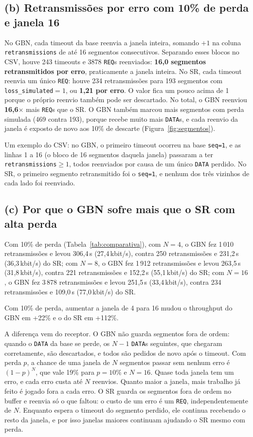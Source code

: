 \subsection*{(b) Retransmissões por erro com 10\% de perda e janela 16}

No GBN, cada timeout da base reenvia a janela inteira, somando $+1$ na coluna \texttt{retransmissions} de até 16 segmentos consecutivos. Separando esses blocos no CSV, houve 243 timeouts e 3878 \texttt{REQ}s reenviados: \textbf{16,0 segmentos retransmitidos por erro}, praticamente a janela inteira. No SR, cada timeout reenvia um único \texttt{REQ}: houve 234 retransmissões para 193 segmentos com \texttt{loss\_simulated}$=1$, ou \textbf{1,21 por erro}. O valor fica um pouco acima de 1 porque o próprio reenvio também pode ser descartado. No total, o GBN reenviou \textbf{16,6$\times$} mais \texttt{REQ}s que o SR. O GBN também marcou mais segmentos com perda simulada (469 contra 193), porque recebe muito mais \texttt{DATA}s, e cada reenvio da janela é exposto de novo aos 10\% de descarte (Figura~\ref{fig:segmentos}).

\par Um exemplo do CSV: no GBN, o primeiro timeout ocorreu na base \texttt{seq=1}, e as linhas 1 a 16 (o bloco de 16 segmentos daquela janela) passaram a ter \texttt{retransmissions}$\geq1$, todos reenviados por causa de um único \texttt{DATA} perdido. No SR, o primeiro segmento retransmitido foi o \texttt{seq=1}, e nenhum dos três vizinhos de cada lado foi reenviado.

\subsection*{(c) Por que o GBN sofre mais que o SR com alta perda}

Com 10\% de perda (Tabela~\ref{tab:comparativa}), com $N=4$, o GBN fez 1\,010 retransmissões e levou 306,4\,s (27,4\,kbit/s), contra 250 retransmissões e 231,2\,s (36,3\,kbit/s) do SR; com $N=8$, o GBN fez 1\,912 retransmissões e levou 263,5\,s (31,8\,kbit/s), contra 221 retransmissões e 152,2\,s (55,1\,kbit/s) do SR; com $N=16$, o GBN fez 3\,878 retransmissões e levou 251,5\,s (33,4\,kbit/s), contra 234 retransmissões e 109,0\,s (77,0\,kbit/s) do SR.

Com 10\% de perda, aumentar a janela de 4 para 16 mudou o throughput do GBN em +22\% e o do SR em +112\%.

\par A diferença vem do receptor. O GBN não guarda segmentos fora de ordem: quando o \texttt{DATA} da base se perde, os $N-1$ \texttt{DATA}s seguintes, que chegaram corretamente, são descartados, e todos são pedidos de novo após o timeout. Com perda $p$, a chance de uma janela de $N$ segmentos passar sem nenhum erro é $(1-p)^N$, que vale 19\% para $p=10\%$ e $N=16$. Quase toda janela tem um erro, e cada erro custa até $N$ reenvios. Quanto maior a janela, mais trabalho já feito é jogado fora a cada erro. O SR guarda os segmentos fora de ordem no buffer e reenvia só o que faltou: o custo de um erro é um \texttt{REQ}, independentemente de $N$. Enquanto espera o timeout do segmento perdido, ele continua recebendo o resto da janela, e por isso janelas maiores continuam ajudando o SR mesmo com perda.

